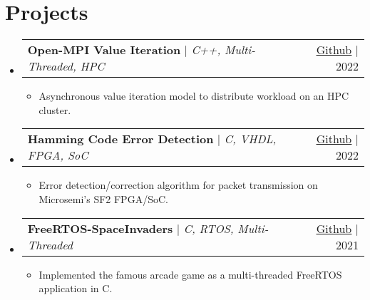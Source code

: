 \documentclass[letterpaper,11pt]{article}
\makeatletter
\newcommand{\resumeItem}[1]{
  \item\small{
    {#1 \vspace{-2pt}}
  }
}
\newcommand{\resumeProjectHeading}[2]{
    \item
    \begin{tabular*}{0.97\textwidth}{l@{\extracolsep{\fill}}r}
      \small#1 & #2 \\
    \end{tabular*}\vspace{-7pt}
}
\newcommand{\resumeSubHeadingListStart}{\begin{itemize}[leftmargin=0.15in, label={}]}
\newcommand{\resumeSubHeadingListEnd}{\end{itemize}}
\newcommand{\resumeItemListStart}{\begin{itemize}}
\newcommand{\resumeItemListEnd}{\end{itemize}\vspace{-5pt}}
\makeatother
\begin{document}
\vspace{-8.0pt}

\section{Projects}
    \resumeSubHeadingListStart
        \resumeProjectHeading
            {\textbf{Open-MPI Value Iteration} $|$ \emph{C++, Multi-Threaded, HPC}}{\href{https://github.com/duclos-cavalcanti/Open-MPI-ValueIteration}{\underline{Github}} $|$ 2022}
            \resumeItemListStart
              \resumeItem{Asynchronous value iteration model to distribute workload on an HPC cluster.}
            \resumeItemListEnd
        \resumeProjectHeading
            {\textbf{Hamming Code Error Detection} $|$ \emph{C, VHDL, FPGA, SoC}}{\href{https://github.com/duclos-cavalcanti/microsemi-error-detection}{\underline{Github}} $|$ 2022}
            \resumeItemListStart
              \resumeItem{Error detection/correction algorithm for packet transmission on Microsemi's SF2 FPGA/SoC.}
            \resumeItemListEnd
        \resumeProjectHeading
            {\textbf{FreeRTOS-SpaceInvaders} $|$ \emph{C, RTOS, Multi-Threaded}}{\href{https://github.com/duclos-cavalcanti/FreeRTOS-SpaceInvaders}{\underline{Github}} $|$ 2021}
            \resumeItemListStart
              \resumeItem{Implemented the famous arcade game as a multi-threaded FreeRTOS application in C.}
            \resumeItemListEnd

    \resumeSubHeadingListEnd
    
\end{document}
